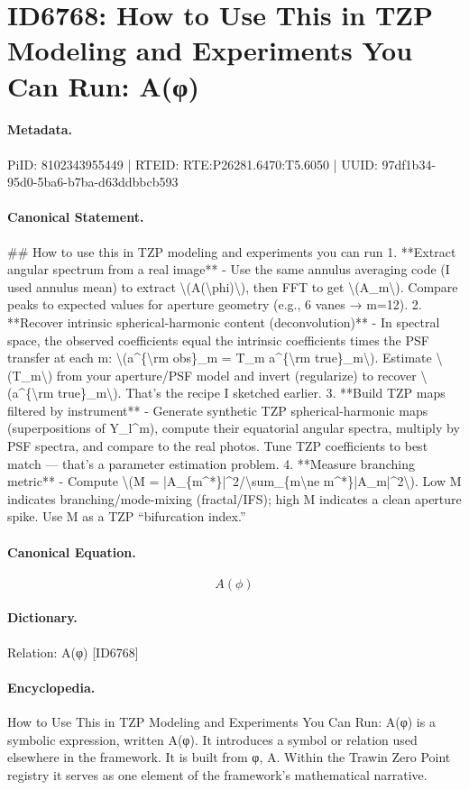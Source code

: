 \section*{ID6768: How to Use This in TZP Modeling and Experiments You Can Run: A(φ)}
\paragraph{Metadata.}
PiID: 8102343955449 | RTEID: RTE:P26281.6470:T5.6050 | UUID: 97df1b34-95d0-5ba6-b7ba-d63ddbbcb593

\paragraph{Canonical Statement.}
\#\# How to use this in TZP modeling and experiments you can run 1. **Extract angular spectrum from a real image** - Use the same annulus averaging code (I used annulus mean) to extract \textbackslash{}(A(\textbackslash{}phi)\textbackslash{}), then FFT to get \textbackslash{}(A\_m\textbackslash{}). Compare peaks to expected values for aperture geometry (e.g., 6 vanes → m=12). 2. **Recover intrinsic spherical-harmonic content (deconvolution)** - In spectral space, the observed coefficients equal the intrinsic coefficients times the PSF transfer at each m: \textbackslash{}(a\textasciicircum{}\{\textbackslash{}rm obs\}\_m = T\_m a\textasciicircum{}\{\textbackslash{}rm true\}\_m\textbackslash{}). Estimate \textbackslash{}(T\_m\textbackslash{}) from your aperture/PSF model and invert (regularize) to recover \textbackslash{}(a\textasciicircum{}\{\textbackslash{}rm true\}\_m\textbackslash{}). That’s the recipe I sketched earlier. 3. **Build TZP maps filtered by instrument** - Generate synthetic TZP spherical-harmonic maps (superpositions of Y\_l\textasciicircum{}m), compute their equatorial angular spectra, multiply by PSF spectra, and compare to the real photos. Tune TZP coefficients to best match — that’s a parameter estimation problem. 4. **Measure branching metric** - Compute \textbackslash{}(M = |A\_\{m\textasciicircum{}*\}|\textasciicircum{}2/\textbackslash{}sum\_\{m\textbackslash{}ne m\textasciicircum{}*\}|A\_m|\textasciicircum{}2\textbackslash{}). Low M indicates branching/mode-mixing (fractal/IFS); high M indicates a clean aperture spike. Use M as a TZP “bifurcation index.”

\paragraph{Canonical Equation.}
\[
A(\phi)
\]

\paragraph{Dictionary.}
Relation: A(φ) [ID6768]

\paragraph{Encyclopedia.}
How to Use This in TZP Modeling and Experiments You Can Run: A(φ) is a symbolic expression, written A(φ). It introduces a symbol or relation used elsewhere in the framework. It is built from φ, A. Within the Trawin Zero Point registry it serves as one element of the framework's mathematical narrative.
